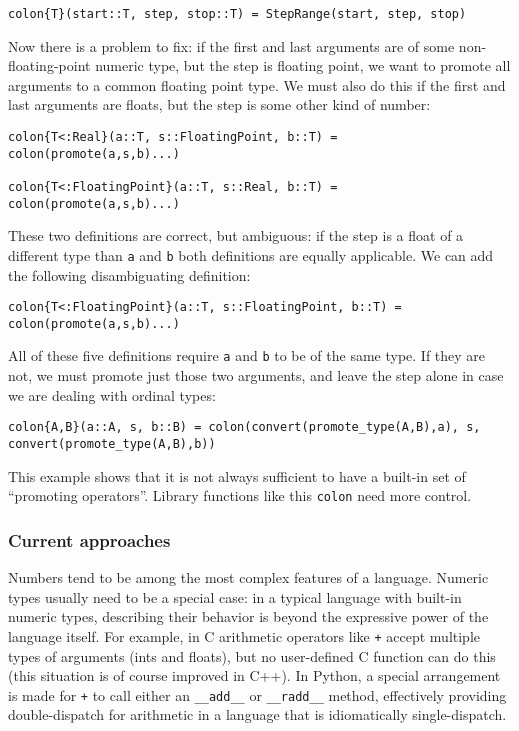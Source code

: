 \begin{verbatim}
colon{T}(start::T, step, stop::T) = StepRange(start, step, stop)
\end{verbatim}

Now there is a problem to fix: if the first and last arguments are of some
non-floating-point numeric type, but the step is floating point, we want to
promote all arguments to a common floating point type. We must also do this
if the first and last arguments are floats, but the step is some other kind
of number:

\begin{verbatim}
colon{T<:Real}(a::T, s::FloatingPoint, b::T) = colon(promote(a,s,b)...)

colon{T<:FloatingPoint}(a::T, s::Real, b::T) = colon(promote(a,s,b)...)
\end{verbatim}

These two definitions are correct, but ambiguous: if the step is a float
of a different type than \texttt{a} and \texttt{b} both definitions are
equally applicable. We can add the following disambiguating definition:

\begin{verbatim}
colon{T<:FloatingPoint}(a::T, s::FloatingPoint, b::T) = colon(promote(a,s,b)...)
\end{verbatim}

All of these five definitions require \texttt{a} and \texttt{b} to be of the
same type. If they are not, we must promote just those two arguments, and leave
the step alone in case we are dealing with ordinal types:

\begin{verbatim}
colon{A,B}(a::A, s, b::B) = colon(convert(promote_type(A,B),a), s, convert(promote_type(A,B),b))
\end{verbatim}

This example shows that it is not always sufficient to have a built-in set of
``promoting operators''. Library functions like this \texttt{colon} need more
control.


\subsubsection{Current approaches}

Numbers tend to be among the most
complex features of a language. Numeric types usually need to be a special
case: in a typical language with built-in numeric types, describing their
behavior is beyond the expressive power of the language itself. For example,
in C arithmetic operators like \texttt{+} accept multiple types of arguments
(ints and floats), but no user-defined C function can do this (this situation
is of course improved in C++). In Python, a special arrangement is made for
\texttt{+} to call either an \texttt{\_\_add\_\_} or \texttt{\_\_radd\_\_} method,
effectively providing double-dispatch for arithmetic in a language that is
idiomatically single-dispatch.



